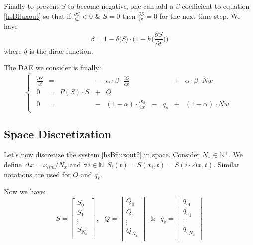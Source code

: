 \documentclass[
journal=jacsat, %
manuscript=article]{achemso}
\begin{document}
Finally to prevent $S$ to become negative, one can add a $\beta$ coefficient to equation \ref{hsBfluxout} so that if $\frac{\partial S}{\partial t}<0$ \& $S=0$ then $\frac{\partial S}{\partial t}=0$ for the next time step. We have 
\begin{equation}
    \beta=1-\delta\big(S\big) \cdot \bigg(1-h\big(\frac{\partial S}{\partial t}\big)\bigg)
\end{equation}
where $\delta$ is the dirac function.

The DAE we consider is finally:
\begin{equation}
\label{hsBfluxout2}
    \begin{cases}
\begin{array}{ccccccccc} 
    \frac{\partial S}{\partial t}  & = &  & - & \alpha \cdot \beta \cdot \frac{\partial Q}{\partial x} &  &  & + & \alpha \cdot \beta \cdot Nw \\
    0 & = &P(S) \cdot S & + & Q & & & &\\
    0 & = & & - & (1-\alpha) \cdot \frac{\partial Q}{\partial x} & - &  q_{s} & + & (1-\alpha) \cdot Nw
\end{array}
\end{cases}
\end{equation}

\subsection{Space Discretization}
Let's now discretize the system \ref{hsBfluxout2} in space. Consider $N_{x} \in \mathbb{N}^{+}$.
We define $ \Delta x= x_{lim} / N_{x}$ and $\forall i \in \mathbb{N} \: \: S_{i}(t)=S(x_{i},t)=S(i\cdot \Delta x,t)$. Similar notations are used for $Q$ and $q_{s}$.

Now we have:
\begin{equation}
S=
\begin{bmatrix}
    S_{0} \\
    S_{1} \\
    \vdots \\
    S_{N_{x}} \\
\end{bmatrix} \, , \: \: \:
Q=
\begin{bmatrix}
    Q_{0} \\
    Q_{1} \\
    \vdots \\
    Q_{N_{x}} \\
\end{bmatrix} \: \: \:  \& \: \: \:
q_{s}=
\begin{bmatrix}
    {q_{s}}_{0} \\
    {q_{s}}_{1} \\
    \vdots \\
    {q_{s}}_{N_{x}} \\
\end{bmatrix}
\end{equation}
\end{document}
